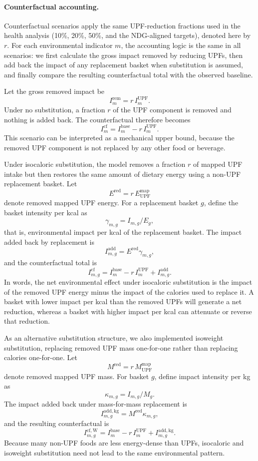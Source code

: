 ﻿\documentclass{article}
\begin{document}
\paragraph*{Counterfactual accounting.}
Counterfactual scenarios apply the same UPF-reduction fractions used in the health analysis (10\%, 20\%, 50\%, and the NDG-aligned targets), denoted here by $r$. For each environmental indicator $m$, the accounting logic is the same in all scenarios: we first calculate the gross impact removed by reducing UPFs, then add back the impact of any replacement basket when substitution is assumed, and finally compare the resulting counterfactual total with the observed baseline.

Let the gross removed impact be
\[
I^{\mathrm{rem}}_{m}=r\,I^{\mathrm{UPF}}_{m}.
\]
Under no substitution, a fraction $r$ of the UPF component is removed and nothing is added back. The counterfactual therefore becomes
\[
I^{\mathrm{cf}}_{m}=I^{\mathrm{base}}_{m}-r\,I^{\mathrm{UPF}}_{m}.
\]
This scenario can be interpreted as a mechanical upper bound, because the removed UPF component is not replaced by any other food or beverage.

Under isocaloric substitution, the model removes a fraction $r$ of mapped UPF intake but then restores the same amount of dietary energy using a non-UPF replacement basket. Let
\[
E^{\mathrm{red}}=r\,E^{\mathrm{map}}_{\mathrm{UPF}}
\]
denote removed mapped UPF energy. For a replacement basket $g$, define the basket intensity per kcal as
\[
\gamma_{m,g}=I_{m,g}/E_g,
\]
that is, environmental impact per kcal of the replacement basket. The impact added back by replacement is
\[
I^{\mathrm{add}}_{m,g}=E^{\mathrm{red}}\gamma_{m,g},
\]
and the counterfactual total is
\[
I^{\mathrm{cf}}_{m,g}=I^{\mathrm{base}}_{m}-r\,I^{\mathrm{UPF}}_{m}+I^{\mathrm{add}}_{m,g}.
\]
In words, the net environmental effect under isocaloric substitution is the impact of the removed UPF energy minus the impact of the calories used to replace it. A basket with lower impact per kcal than the removed UPFs will generate a net reduction, whereas a basket with higher impact per kcal can attenuate or reverse that reduction.

As an alternative substitution structure, we also implemented isoweight substitution, replacing removed UPF mass one-for-one rather than replacing calories one-for-one. Let
\[
M^{\mathrm{red}}=r\,M^{\mathrm{map}}_{\mathrm{UPF}}
\]
denote removed mapped UPF mass. For basket $g$, define impact intensity per kg as
\[
\kappa_{m,g}=I_{m,g}/M_g.
\]
The impact added back under mass-for-mass replacement is
\[
I^{\mathrm{add,kg}}_{m,g}=M^{\mathrm{red}}\kappa_{m,g},
\]
and the resulting counterfactual is
\[
I^{\mathrm{cf,W}}_{m,g}=I^{\mathrm{base}}_{m}-r\,I^{\mathrm{UPF}}_{m}+I^{\mathrm{add,kg}}_{m,g}.
\]
Because many non-UPF foods are less energy-dense than UPFs, isocaloric and isoweight substitution need not lead to the same environmental pattern.
\end{document}
